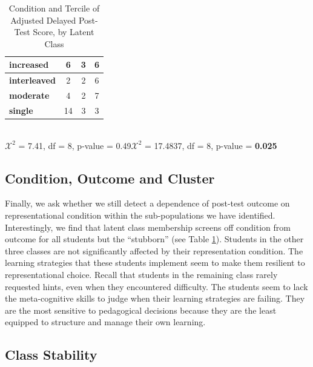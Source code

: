 \documentclass{edm_template}
\begin{document}
\begin{table}[htbp]
\begin{center}
\begin{tabular}{|l || c | c | c |}
  \textbf{increased}&    6&  3&  6 \\ \hline
  \textbf{interleaved}&  2&  2&  6 \\ \hline
  \textbf{moderate}&     4&  2& 7 \\ \hline
  \textbf{single}&       14&  3&  3 \\ \hline
 \end{tabular}
\\$\mathcal{X}^2$ = 7.41, df = 8, p-value = 0.49\hspace{15pt}$\mathcal{X}^2$ = 17.4837, df = 8, p-value = {\bf 0.025}
\end{center}
\caption{Condition and Tercile of Adjusted Delayed Post-Test Score, by Latent Class}
\label{tab:exp-and-score-by-lc}
\end{table}
\subsection{Condition, Outcome and Cluster}
Finally, we ask whether we still detect a dependence of post-test outcome on representational condition within the sub-populations we have identified. Interestingly, we find that latent class membership screens off condition from outcome for all students but the ``stubborn'' (see Table \ref{tab:exp-and-score-by-lc}). Students in the other three classes are not significantly affected by their representation condition. The learning strategies that these students implement seem to make them resilient to representational choice. Recall that students in the remaining class rarely requested hints, even when they encountered difficulty. The students seem to lack the meta-cognitive skills to judge when their learning strategies are failing. They are the most sensitive to pedagogical decisions because they are the least equipped to structure and manage their own learning. 

\subsection{Class Stability}
\end{document}
